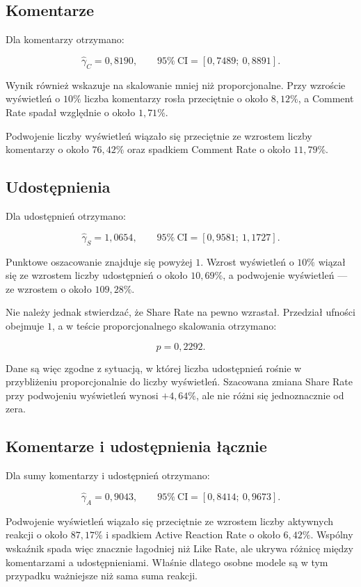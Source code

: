 \documentclass[12pt,a4paper]{article}
\begin{document}
\subsection{Komentarze}

Dla komentarzy otrzymano:

\[
\widehat{\gamma}_{C}=0{,}8190,
\qquad
95\%\ \mathrm{CI}=[0{,}7489;\ 0{,}8891].
\]

Wynik również wskazuje na skalowanie mniej niż proporcjonalne. Przy wzroście wyświetleń o $10\%$ liczba komentarzy rosła przeciętnie o około $8{,}12\%$, a Comment Rate spadał względnie o około $1{,}71\%$.

Podwojenie liczby wyświetleń wiązało się przeciętnie ze wzrostem liczby komentarzy o około $76{,}42\%$ oraz spadkiem Comment Rate o około $11{,}79\%$.

\subsection{Udostępnienia}

Dla udostępnień otrzymano:

\[
\widehat{\gamma}_{S}=1{,}0654,
\qquad
95\%\ \mathrm{CI}=[0{,}9581;\ 1{,}1727].
\]

Punktowe oszacowanie znajduje się powyżej $1$. Wzrost wyświetleń o $10\%$ wiązał się ze wzrostem liczby udostępnień o około $10{,}69\%$, a podwojenie wyświetleń --- ze wzrostem o około $109{,}28\%$.

Nie należy jednak stwierdzać, że Share Rate na pewno wzrastał. Przedział ufności obejmuje $1$, a w teście proporcjonalnego skalowania otrzymano:

\[
p=0{,}2292.
\]

Dane są więc zgodne z sytuacją, w której liczba udostępnień rośnie w przybliżeniu proporcjonalnie do liczby wyświetleń. Szacowana zmiana Share Rate przy podwojeniu wyświetleń wynosi $+4{,}64\%$, ale nie różni się jednoznacznie od zera.

\subsection{Komentarze i udostępnienia łącznie}

Dla sumy komentarzy i udostępnień otrzymano:

\[
\widehat{\gamma}_{A}=0{,}9043,
\qquad
95\%\ \mathrm{CI}=[0{,}8414;\ 0{,}9673].
\]

Podwojenie wyświetleń wiązało się przeciętnie ze wzrostem liczby aktywnych reakcji o około $87{,}17\%$ i spadkiem Active Reaction Rate o około $6{,}42\%$. Wspólny wskaźnik spada więc znacznie łagodniej niż Like Rate, ale ukrywa różnicę między komentarzami a udostępnieniami. Właśnie dlatego osobne modele są w tym przypadku ważniejsze niż sama suma reakcji.
\end{document}
